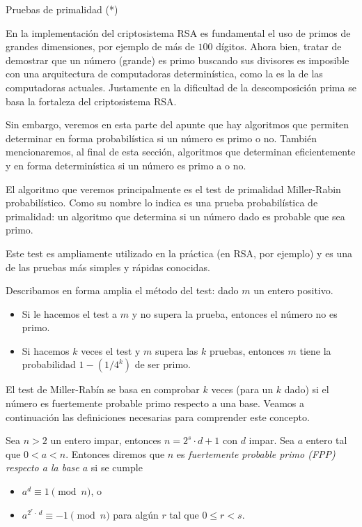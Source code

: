 \begin{section}{Pruebas de primalidad (*)}
    
En la implementación del  criptosistema RSA  es fundamental el uso de primos de grandes dimensiones, por ejemplo de más de $100$  dígitos. Ahora bien,  tratar de  demostrar que un número  (grande) es primo buscando sus divisores es imposible con una arquitectura de computadoras determinística,  como la es la de las computadoras actuales. Justamente en la dificultad de la descomposición prima se basa la fortaleza del criptosistema RSA. 

Sin embargo,  veremos en esta parte del apunte  que hay algoritmos que permiten determinar en forma probabilística si un número es primo o no. También mencionaremos, al final de esta sección, algoritmos que determinan eficientemente y en forma determinística si un número es primo a o no. 


El algoritmo que veremos principalmente es el test de primalidad Miller-Rabin probabilístico. Como su nombre lo indica  es una prueba probabilística de primalidad: un algoritmo que determina si un número dado es probable que sea primo.

Este test es ampliamente utilizado en la práctica (en RSA, por ejemplo) y es una de las pruebas más simples y rápidas conocidas.

Describamos en forma amplia el método del test: dado $m$ un entero positivo.
\begin{itemize}
    \item Si le hacemos el test a $m$ y no supera la prueba, entonces el número no es primo. 
    \item Si hacemos $k$ veces el test y $m$ supera las $k$ pruebas, entonces  $m$ tiene la probabilidad $1 - ( 1 / 4^k)$ de ser primo. 
\end{itemize}

El test de  Miller-Rabín se basa en comprobar $k$ veces (para un $k$ dado) si el número es fuertemente probable primo respecto a una base. Veamos a continuación las definiciones necesarias para comprender este concepto. 

\begin{definicion}
    Sea $n > 2$ un entero impar, entonces $n = 2^s \cdot d + 1$ con $d$ impar. Sea $a$ entero  tal que $0 < a < n$. Entonces diremos que $n$ es \textit{fuertemente probable primo (FPP) respecto a la base $a$} si se cumple
    \begin{itemize}
        \item $a^{d} \equiv 1 \pmod{n}$, o
        \item $a^{2^r\cdot\, d} \equiv -1 \pmod{n}$  para algún $r$ tal que $0 \le r < s$.
    \end{itemize}
\end{definicion}


\end{section}
